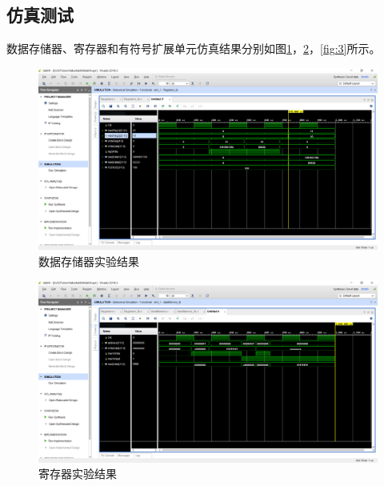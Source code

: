 \documentclass{progartcn}
\begin{document}
\subsection{仿真测试}

数据存储器、寄存器和有符号扩展单元仿真结果分别如图\ref{fig:1}，\ref{fig:2}，\ref{fig:3}所示。

\begin{figure}[htbp]
    \centering
    \includegraphics[scale=0.3]{../figure/04/lab04-1.PNG}
    \caption{数据存储器实验结果}\label{fig:1}
\end{figure}

\begin{figure}[htbp]
    \centering
    \includegraphics[scale=0.3]{../figure/04/lab04-2.PNG}
    \caption{寄存器实验结果}\label{fig:2}
\end{figure}
\end{document}
